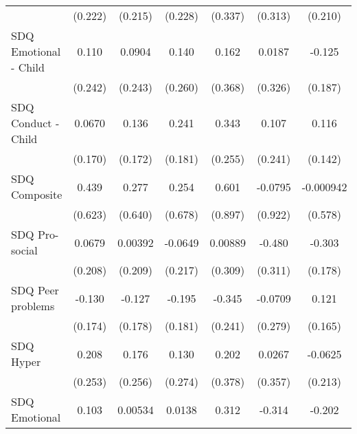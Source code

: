 {\begin{tabular}{l*{6}{c}}
            &     (0.222)         &     (0.215)         &     (0.228)         &     (0.337)         &     (0.313)         &     (0.210)         \\
\addlinespace
SDQ Emotional - Child&       0.110         &      0.0904         &       0.140         &       0.162         &      0.0187         &      -0.125         \\
            &     (0.242)         &     (0.243)         &     (0.260)         &     (0.368)         &     (0.326)         &     (0.187)         \\
\addlinespace
SDQ Conduct - Child&      0.0670         &       0.136         &       0.241         &       0.343         &       0.107         &       0.116         \\
            &     (0.170)         &     (0.172)         &     (0.181)         &     (0.255)         &     (0.241)         &     (0.142)         \\
\addlinespace
SDQ Composite&       0.439         &       0.277         &       0.254         &       0.601         &     -0.0795         &   -0.000942         \\
            &     (0.623)         &     (0.640)         &     (0.678)         &     (0.897)         &     (0.922)         &     (0.578)         \\
\addlinespace
SDQ Pro-social&      0.0679         &     0.00392         &     -0.0649         &     0.00889         &      -0.480         &      -0.303         \\
            &     (0.208)         &     (0.209)         &     (0.217)         &     (0.309)         &     (0.311)         &     (0.178)         \\
\addlinespace
SDQ Peer problems&      -0.130         &      -0.127         &      -0.195         &      -0.345         &     -0.0709         &       0.121         \\
            &     (0.174)         &     (0.178)         &     (0.181)         &     (0.241)         &     (0.279)         &     (0.165)         \\
\addlinespace
SDQ Hyper   &       0.208         &       0.176         &       0.130         &       0.202         &      0.0267         &     -0.0625         \\
            &     (0.253)         &     (0.256)         &     (0.274)         &     (0.378)         &     (0.357)         &     (0.213)         \\
\addlinespace
SDQ Emotional&       0.103         &     0.00534         &      0.0138         &       0.312         &      -0.314         &      -0.202         \\

\end{tabular}}
